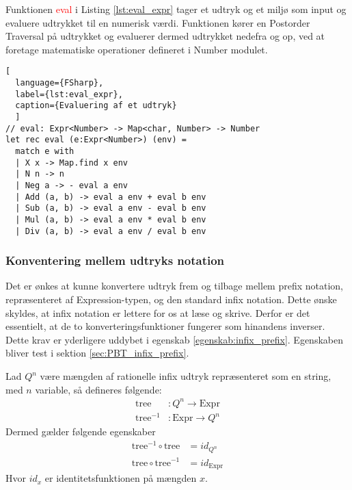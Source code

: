 \documentclass{article}
\begin{document}
Funktionen \textcolor{red}{eval} i Listing \ref{lst:eval_expr} tager et udtryk og et miljø som input og evaluere udtrykket til en numerisk værdi. Funktionen kører en Postorder Traversal på udtrykket og evaluerer dermed udtrykket nedefra og op, ved at foretage matematiske operationer defineret i Number modulet. 

\begin{lstlisting}[
  language={FSharp}, 
  label={lst:eval_expr}, 
  caption={Evaluering af et udtryk}
  ]
// eval: Expr<Number> -> Map<char, Number> -> Number
let rec eval (e:Expr<Number>) (env) =
  match e with
  | X x -> Map.find x env
  | N n -> n
  | Neg a -> - eval a env
  | Add (a, b) -> eval a env + eval b env
  | Sub (a, b) -> eval a env - eval b env
  | Mul (a, b) -> eval a env * eval b env
  | Div (a, b) -> eval a env / eval b env
\end{lstlisting}

\subsubsection{Konventering mellem udtryks notation}\label{sec:expression_generation}
Det er ønkes at kunne konvertere udtryk frem og tilbage mellem prefix notation, repræsenteret af Expression-typen, og den standard infix notation. Dette ønske skyldes, at infix notation er lettere for os at læse og skrive. Derfor er det essentielt, at de to konverteringsfunktioner fungerer som hinandens inverser. Dette krav er yderligere uddybet i egenskab \ref{egenskab:infix_prefix}. Egenskaben bliver test i sektion \ref{sec:PBT_infix_prefix}.

\vspace{0.5cm}
\begin{egenskab}\label{egenskab:infix_prefix}
    Lad $Q^n$ være mængden af rationelle infix udtryk repræsenteret som en string, med $n$ variable, så defineres følgende:
    \begin{align*}
      \text{tree}&: Q^n \to \text{Expr} \\
      \text{tree}^{-1}&: \text{Expr} \to  Q^n  
    \end{align*}
    Dermed gælder følgende egenskaber
    \begin{align*}
      \text{tree}^{-1} \circ \text{tree} &= id_{Q^n} \\
      \text{tree} \circ \text{tree}^{-1} &= id_{\text{Expr}}
    \end{align*}
    Hvor $id_{x}$ er identitetsfunktionen på mængden $x$.
\end{egenskab}
\end{document}

